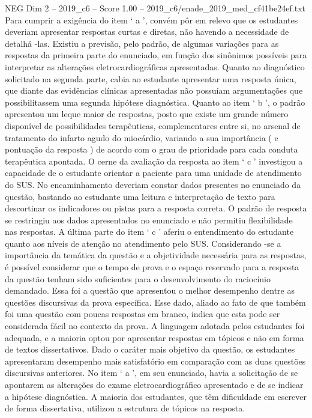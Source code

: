 \begin{textsample}{NEG Dim 2 – 2019\_c6 – Score 1.00 – 2019\_c6/enade\_2019\_med\_cf41be24ef.txt}
Para cumprir a exigência do item ‘ a ’, convém pôr em relevo que os estudantes deveriam apresentar respostas curtas e diretas, não havendo a necessidade de detalhá -las.
Existiu a previsão, pelo padrão, de algumas variações para as respostas da primeira parte do enunciado, em função dos sinônimos possíveis para interpretar as alterações eletrocardiográficas apresentadas.
Quanto ao diagnóstico solicitado na segunda parte, cabia ao estudante apresentar uma resposta única, que diante das evidências clínicas apresentadas não possuíam argumentações que possibilitassem uma segunda hipótese diagnóstica.
Quanto ao item ‘ b ’, o padrão apresentou um leque maior de respostas, posto que existe um grande número disponível de possibilidades terapêuticas, complementares entre si, no arsenal de tratamento do infarto agudo do miocárdio, variando a sua importância ( e pontuação da resposta ) de acordo com o grau de prioridade para cada conduta terapêutica apontada.
O cerne da avaliação da resposta ao item ‘ c ’ investigou a capacidade de o estudante orientar a paciente para uma unidade de atendimento do SUS.
No encaminhamento deveriam constar dados presentes no enunciado da questão, bastando ao estudante uma leitura e interpretação de texto para descortinar os indicadores ou pistas para a resposta correta.
O padrão de resposta se restringiu aos dados apresentados no enunciado e não permitiu flexibilidade nas respostas.
A última parte do item ‘ c ’ aferiu o entendimento do estudante quanto aos níveis de atenção no atendimento pelo SUS.
Considerando -se a importância da temática da questão e a objetividade necessária para as respostas, é possível considerar que o tempo de prova e o espaço reservado para a resposta da questão tenham sido suficientes para o desenvolvimento do raciocínio demandado.
Essa foi a questão que apresentou o melhor desempenho dentre as questões discursivas da prova específica.
Esse dado, aliado ao fato de que também foi uma questão com poucas respostas em branco, indica que esta pode ser considerada fácil no contexto da prova.
A linguagem adotada pelos estudantes foi adequada, e a maioria optou por apresentar respostas em tópicos e não em forma de textos dissertativos.
Dado o caráter mais objetivo da questão, os estudantes apresentaram desempenho mais satisfatório em comparação com as duas questões discursivas anteriores.
No item ‘ a ’, em seu enunciado, havia a solicitação de se apontarem as alterações do exame eletrocardiográfico apresentado e de se indicar a hipótese diagnóstica.
A maioria dos estudantes, que têm dificuldade em escrever de forma dissertativa, utilizou a estrutura de tópicos na resposta.

\end{textsample}
